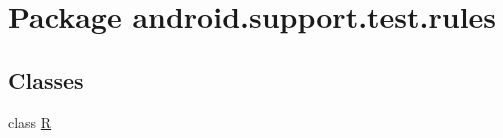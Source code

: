 \hypertarget{namespaceandroid_1_1support_1_1test_1_1rules}{}\section{Package android.\+support.\+test.\+rules}
\label{namespaceandroid_1_1support_1_1test_1_1rules}
\subsection*{Classes}
\begin{DoxyCompactItemize}
\item 
class \mbox{\hyperlink{classandroid_1_1support_1_1test_1_1rules_1_1R}{R}}
\end{DoxyCompactItemize}
